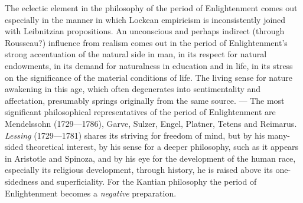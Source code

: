 The eclectic element in the philosophy of the period of Enlightenment comes out especially in the
manner in which Lockean empiricism is inconsistently joined with Leibnitzian propositions. An
unconscious and perhaps indirect (through Rousseau?) influence from realism comes out in the period
of Enlightenment's strong accentuation of the natural side in man, in its respect for natural
endowments, in its demand for naturalness in education and in life, in its stress on the
significance of the material conditions of life. The living sense for nature awakening in this age,
which often degenerates into sentimentality and affectation, presumably springs
originally from the same source. --- The most significant philosophical representatives of the
period of Enlightenment are Mendelssohn (1729---1786), Garve, Sulzer, Engel, Platner, Tetens and
Reimarus. \emph{Lessing} (1729---1781) shares its striving for freedom of mind, but by his
many-sided theoretical interest, by his sense for a deeper philosophy, such as it appears in
Aristotle and Spinoza, and by his eye for the development of the human race, especially its
religious development, through history, he is raised above its one-sidedness and superficiality.
For the Kantian philosophy the period of Enlightenment becomes a \emph{negative} preparation.

\divrule

